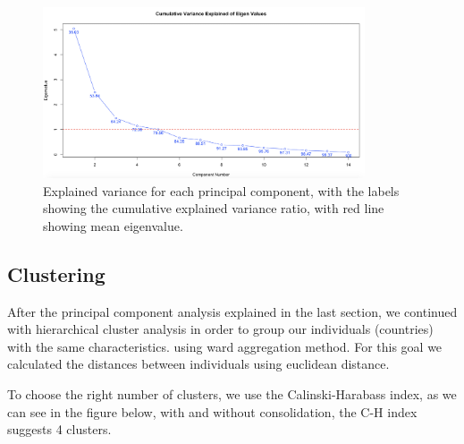 \documentclass[12pt]{extarticle}
\begin{document}
\begin{figure}[H]
  \centering
    \includegraphics[width=0.85\textwidth]{figures/pca_eigenvalue.png}
    \caption{Explained variance for each principal component, with the labels showing the cumulative explained variance ratio, with red line showing mean eigenvalue.\label{fig:pca_ind}}
\end{figure}

\subsection{Clustering}

After the principal component analysis explained in the last section, we continued with hierarchical cluster analysis in order to group our individuals (countries) with the same characteristics. using ward aggregation method. For this goal we calculated the distances between individuals using euclidean distance.

To choose the right number of clusters, we use the Calinski-Harabass index, as we can see in the figure below, with and without consolidation, the C-H index suggests 4 clusters.
\end{document}
